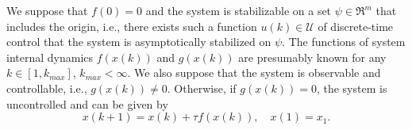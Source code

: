 We suppose that $f(0)=0$ and the system is stabilizable on a set
$\psi \in \mathfrak{R}^m$ that includes the origin, i.e., there exists such a
function $u(k) \in \mathcal{U}$ of discrete-time control that the system is
asymptotically stabilized on $\psi$.
The functions of system internal dynamics $f(x(k))$ and $g(x(k))$ are
presumably known for any $k \in [1, k_{max}]$, $k_{max} < \infty$.
We also suppose that the system is observable and controllable, i.e.,
$g(x(k)) \neq 0$. Otherwise, if $g(x(k)) = 0$, the system is uncontrolled
and can be given by
\begin{equation}
	\label{eq:uncontrolled_system}
	x(k+1) = x(k) +\tau f(x(k)), \quad x(1) = x_1.
\end{equation}
